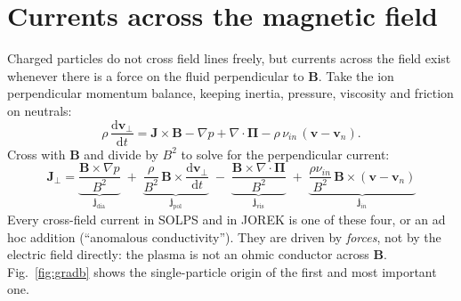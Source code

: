 \documentclass[11pt,a4paper]{article}
\newcommand{\bB}{\mathbf{B}}
\newcommand{\bJ}{\mathbf{J}}
\newcommand{\bv}{\mathbf{v}}
\newcommand{\divg}{\nabla\!\cdot\!}
\newcommand{\jdia}{\mathbf{j}_{\mathrm{dia}}}
\newcommand{\jpol}{\mathbf{j}_{\mathrm{pol}}}
\newcommand{\jvis}{\mathbf{j}_{\mathrm{vis}}}
\newcommand{\dd}{\mathrm{d}}
\begin{document}
\section{Currents across the magnetic field}
\label{sec:perp}

Charged particles do not cross field lines freely, but currents across the field exist whenever there is a force on
the fluid perpendicular to $\bB$. Take the ion perpendicular momentum balance, keeping inertia, pressure, viscosity and
friction on neutrals:
\begin{equation}
  \rho\,\frac{\dd\bv_\perp}{\dd t} = \bJ\times\bB - \nabla p + \divg\mathbf{\Pi} - \rho\,\nu_{in}\,(\bv - \bv_n) .
  \label{eq:perpmom}
\end{equation}
Cross with $\bB$ and divide by $B^2$ to solve for the perpendicular current:
\begin{equation}
  \boxed{\;\bJ_\perp = \underbrace{\frac{\bB\times\nabla p}{B^2}}_{\jdia}
  \;+\; \underbrace{\frac{\rho}{B^2}\,\bB\times\frac{\dd\bv_\perp}{\dd t}}_{\jpol}
  \;-\; \underbrace{\frac{\bB\times\divg\mathbf{\Pi}}{B^2}}_{\jvis}
  \;+\; \underbrace{\frac{\rho\nu_{in}}{B^2}\,\bB\times(\bv-\bv_n)}_{\mathbf{j}_{in}}\;}
  \label{eq:jperp}
\end{equation}
Every cross-field current in SOLPS and in JOREK is one of these four, or an ad hoc addition (``anomalous
conductivity''). They are driven by \emph{forces}, not by the electric field directly: the plasma is not an ohmic
conductor across $\bB$. Fig.~\ref{fig:gradb} shows the single-particle origin of the first and most important one.
\end{document}
